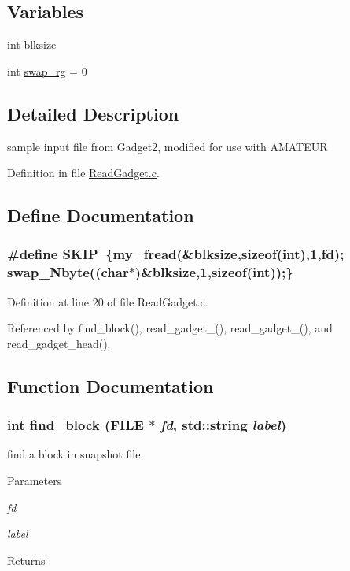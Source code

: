 \subsection*{Variables}
\begin{DoxyCompactItemize}
\item 
int \hyperlink{ReadGadget_8c_a5db008489406de834c7b5598d3b90f40}{blksize}
\item 
int \hyperlink{ReadGadget_8c_ae70144953948473460e0504c93802402}{swap\_\-rg} = 0
\end{DoxyCompactItemize}


\subsection{Detailed Description}
sample input file from Gadget2, modified for use with AMATEUR 

Definition in file \hyperlink{ReadGadget_8c_source}{ReadGadget.c}.



\subsection{Define Documentation}
\subsubsection[{SKIP}]{\setlength{\rightskip}{0pt plus 5cm}\#define SKIP~\{my\_\-fread(\&{\bf blksize},sizeof(int),1,fd); swap\_\-Nbyte((char$\ast$)\&{\bf blksize},1,sizeof(int));\}}\label{ReadGadget_8c_a688a4adbb87520a2b68681bd6bfb199e}


Definition at line 20 of file ReadGadget.c.



Referenced by find\_\-block(), read\_\-gadget\_(), read\_\-gadget\_(), and read\_\-gadget\_\-head().



\subsection{Function Documentation}
\subsubsection[{find\_\-block}]{\setlength{\rightskip}{0pt plus 5cm}int find\_\-block (FILE $\ast$ {\em fd}, \/  std::string {\em label})}\label{ReadGadget_8c_acd254afd3ef5345fbda710dc1e9fc3b8}
find a block in snapshot file 
\begin{DoxyParams}{Parameters}
\item[{\em fd}]\item[{\em label}]\end{DoxyParams}
\begin{DoxyReturn}{Returns}

\end{DoxyReturn}


